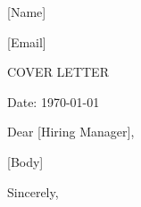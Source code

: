 \documentclass[11pt,a4]{article}
\begin{document}
\begin{center}
    \begin{minipage}[b]{0.5\textwidth}
            \centering
            {\Huge [Name]} \\ %
            \par \vspace{0.2cm}[Email]
    \end{minipage}%

    
\vspace{-0.15cm} 
{\color{UI_blue} \hrulefill}
\end{center}

\justify
\setlength{\parindent}{0pt}
\setlength{\parskip}{12pt}
\vspace{0.2cm}
\begin{center}
    {\color{UI_blue} \Large{COVER LETTER}}
\end{center}



Date: \today \par \vspace{-0.1cm}
Dear [Hiring Manager], %

[Body] \par


\vspace{0.5cm}
\raggedright
 Sincerely, 
 \par [Name]
 
\end{document}
